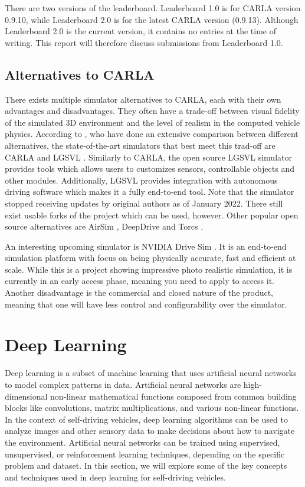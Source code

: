 There are two versions of the leaderboard. Leaderboard 1.0 is for CARLA version 0.9.10, while Leaderboard 2.0 is for the latest CARLA version (0.9.13). Although Leaderboard 2.0 is the current version, it contains no entries at the time of writing. This report will therefore discuss submissions from Leaderboard 1.0.


\subsection{Alternatives to CARLA}
There exists multiple simulator alternatives to CARLA, each with their own advantages and disadvantages. They often have a trade-off between visual fidelity of the simulated 3D environment and the level of realism in the computed vehicle physics. According to \textcite{carla-an-inside-out}, who have done an extensive comparison between different alternatives, the state-of-the-art simulators that best meet this trad-off are CARLA and LGSVL \cite{LGSVL-simulator}. Similarly to CARLA, the open source LGSVL simulator provides tools which allows users to customizes sensors, controllable objects and other modules. Additionally, LGSVL provides integration with autonomous driving software which makes it a fully end-to-end tool. Note that the simulator stopped receiving updates by original authors as of January 2022. There still exist usable forks of the project which can be used, however. Other popular open source alternatives are AirSim \cite{airsim}, DeepDrive \cite{deepdrive} and Torcs \cite{torcs}.

An interesting upcoming simulator is NVIDIA Drive Sim \cite{nvidia-drive-sim}. It is an end-to-end simulation platform with focus on being physically accurate, fast and efficient at scale. While this is a project showing impressive photo realistic simulation, it is currently in an early access phase, meaning you need to apply to access it. Another disadvantage is the commercial and closed nature of the product, meaning that one will have less control and configurability over the simulator.


\section{Deep Learning}

Deep learning is a subset of machine learning that uses artificial neural networks to model complex patterns in data.
Artificial neural networks are high-dimensional non-linear mathematical functions
composed from common building blocks like
convolutions, matrix multiplications, and various non-linear functions.
In the context of self-driving vehicles,
deep learning algorithms can be used to analyze images and other sensory data to make decisions about how to navigate the environment.
Artificial neural networks can be trained using supervised, unsupervised, or reinforcement learning techniques,
depending on the specific problem and dataset.
In this section,
we will explore some of the key concepts and techniques used in deep learning for self-driving vehicles.


